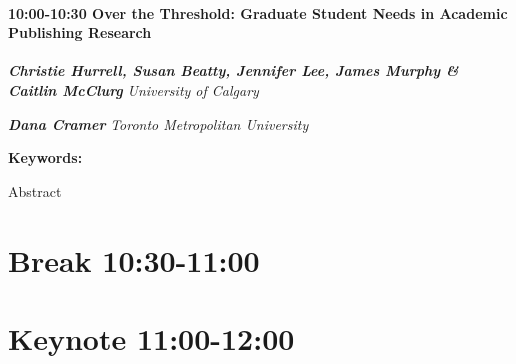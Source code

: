 \documentclass[
]{book}
\begin{document}
\begin{session}
\hypertarget{over-the-threshold-graduate-student-needs-in-academic-publishing-research}{%
\paragraph*{\texorpdfstring{10:00-10:30 \textbar{} \textbf{Over the
Threshold: Graduate Student Needs in Academic Publishing} \textbar{}
Research}{10:00-10:30 \textbar{} Over the Threshold: Graduate Student Needs in Academic Publishing \textbar{} Research}}\label{over-the-threshold-graduate-student-needs-in-academic-publishing-research}}

\textbf{\emph{Christie Hurrell, Susan Beatty, Jennifer Lee, James Murphy
\& Caitlin McClurg}} \textbar{} \emph{University of Calgary}

\textbf{\emph{Dana Cramer}} \textbar{} \emph{Toronto Metropolitan
University}

\textbf{Keywords:}

Abstract
\end{session}

\hypertarget{break-1030-1100}{%
\section*{Break \textbar{} 10:30-11:00}\label{break-1030-1100}}

\hypertarget{keynote-1100-1200}{%
\section*{Keynote \textbar{} 11:00-12:00}\label{keynote-1100-1200}}
\end{document}
